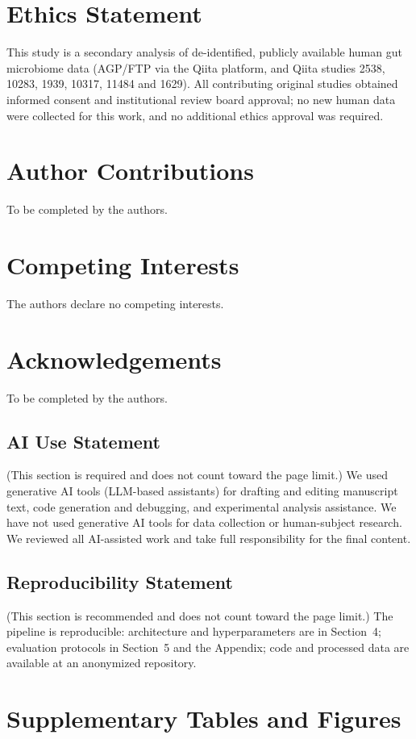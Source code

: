 \documentclass{article} %
\begin{document}
\section*{Ethics Statement}
This study is a secondary analysis of de-identified, publicly available human gut microbiome data (AGP/FTP via the Qiita platform, and Qiita studies 2538, 10283, 1939, 10317, 11484 and 1629). All contributing original studies obtained informed consent and institutional review board approval; no new human data were collected for this work, and no additional ethics approval was required.

\section*{Author Contributions}
To be completed by the authors.

\section*{Competing Interests}
The authors declare no competing interests.

\section*{Acknowledgements}
To be completed by the authors.

\subsection*{AI Use Statement}
(This section is required and does not count toward the page limit.)
We used generative AI tools (LLM-based assistants) for drafting and editing manuscript text, code generation and debugging, and experimental analysis assistance. We have not used generative AI tools for data collection or human-subject research. We reviewed all AI-assisted work and take full responsibility for the final content.
\subsection*{Reproducibility Statement}
(This section is recommended and does not count toward the page limit.)
The pipeline is reproducible: architecture and hyperparameters are in Section~4; evaluation protocols in Section~5 and the Appendix; code and processed data are available at an anonymized repository.

\appendix
\section{Supplementary Tables and Figures}
\end{document}
